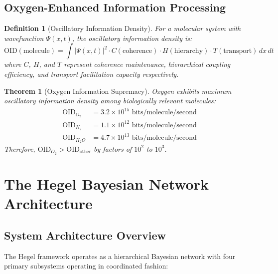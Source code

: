 \documentclass[12pt,a4paper]{article}
\newtheorem{theorem}{Theorem}
\newtheorem{definition}{Definition}
\begin{document}
\subsection{Oxygen-Enhanced Information Processing}

\begin{definition}[Oscillatory Information Density]
For a molecular system with wavefunction $\Psi(x,t)$, the oscillatory information density is:
\begin{equation}
\text{OID}(\text{molecule}) = \int |\Psi(x,t)|^2 \cdot C(\text{coherence}) \cdot H(\text{hierarchy}) \cdot T(\text{transport}) \, dx \, dt
\end{equation}
where $C$, $H$, and $T$ represent coherence maintenance, hierarchical coupling efficiency, and transport facilitation capacity respectively.
\end{definition}

\begin{theorem}[Oxygen Information Supremacy]
Oxygen exhibits maximum oscillatory information density among biologically relevant molecules:
\begin{align}
\text{OID}_{O_2} &= 3.2 \times 10^{15} \text{ bits/molecule/second} \\
\text{OID}_{N_2} &= 1.1 \times 10^{12} \text{ bits/molecule/second} \\
\text{OID}_{H_2O} &= 4.7 \times 10^{13} \text{ bits/molecule/second}
\end{align}
Therefore, $\text{OID}_{O_2} > \text{OID}_{\text{other}}$ by factors of $10^2$ to $10^3$.
\end{theorem}

\section{The Hegel Bayesian Network Architecture}

\subsection{System Architecture Overview}

The Hegel framework operates as a hierarchical Bayesian network with four primary subsystems operating in coordinated fashion:
\end{document}

